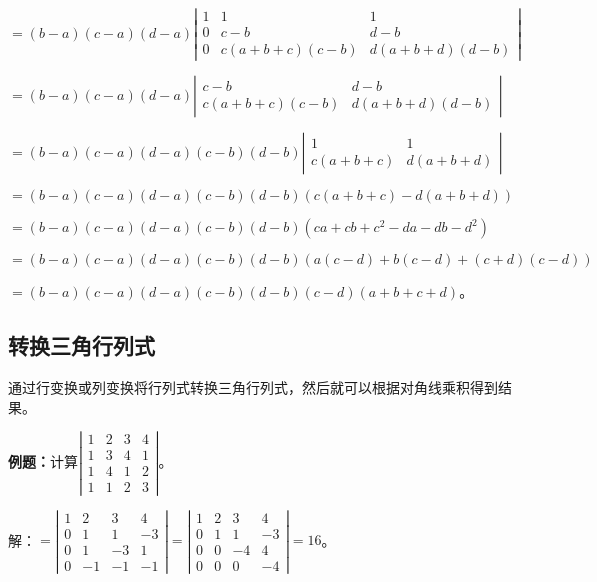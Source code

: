 \documentclass[UTF8, 12pt]{ctexart}
\begin{document}
$=(b-a)(c-a)(d-a)\left|\begin{array}{ccc}
    1 & 1 & 1 \\
    0 & c-b & d-b \\
    0 & c(a+b+c)(c-b) & d(a+b+d)(d-b)
\end{array}\right|$

$=(b-a)(c-a)(d-a)\left|\begin{array}{cc}
    c-b & d-b \\
    c(a+b+c)(c-b) & d(a+b+d)(d-b)
\end{array}\right|$

$=(b-a)(c-a)(d-a)(c-b)(d-b)\left|\begin{array}{cc}
    1 & 1 \\
    c(a+b+c) & d(a+b+d)
\end{array}\right|$

$=(b-a)(c-a)(d-a)(c-b)(d-b)(c(a+b+c)-d(a+b+d))$

$=(b-a)(c-a)(d-a)(c-b)(d-b)(ca+cb+c^2-da-db-d^2)$

$=(b-a)(c-a)(d-a)(c-b)(d-b)(a(c-d)+b(c-d)+(c+d)(c-d))$

$=(b-a)(c-a)(d-a)(c-b)(d-b)(c-d)(a+b+c+d)$。

\subsection{转换三角行列式}

通过行变换或列变换将行列式转换三角行列式，然后就可以根据对角线乘积得到结果。

\textbf{例题：}计算$\left|\begin{array}{cccc} 
    1 & 2 & 3 & 4 \\
    1 & 3 & 4 & 1 \\
    1 & 4 & 1 & 2 \\
    1 & 1 & 2 & 3
\end{array}\right|$。

解：$=\left|\begin{array}{cccc} 
    1 & 2 & 3 & 4 \\
    0 & 1 & 1 & -3 \\
    0 & 1 & -3 & 1 \\
    0 & -1 & -1 & -1
\end{array}\right|
=\left|\begin{array}{cccc} 
    1 & 2 & 3 & 4 \\
    0 & 1 & 1 & -3 \\
    0 & 0 & -4 & 4 \\
    0 & 0 & 0 & -4
\end{array}\right|=16$。
\end{document}
